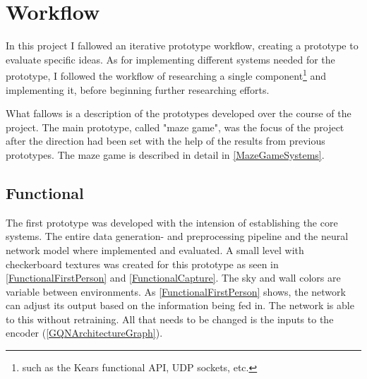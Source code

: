 
\chapter{Workflow}
In this project I fallowed an iterative prototype workflow, creating a prototype to evaluate specific ideas. As for implementing different systems needed for the prototype, I followed the workflow of researching a single component\footnote{such as the Kears functional API, UDP sockets, etc.} and implementing it, before beginning further researching efforts.

What fallows is a description of the prototypes developed over the course of the project. The main prototype, called "maze game", was the focus of the project after the direction had been set with the help of the results from previous prototypes. The maze game is described in detail in \cref{MazeGameSystems}.


\section{Functional}
The first prototype was developed with the intension of establishing the core systems. The entire data generation- and preprocessing pipeline and the neural network model where implemented and evaluated. A small level with checkerboard textures was created for this prototype as seen in \cref{FunctionalFirstPerson} and \cref{FunctionalCapture}. The sky and wall colors are variable between environments. As \cref{FunctionalFirstPerson} shows, the network can adjust its output based on the information being fed in. The network is able to this without retraining. All that needs to be changed is the inputs to the encoder (\cref{GQNArchitectureGraph}). 

